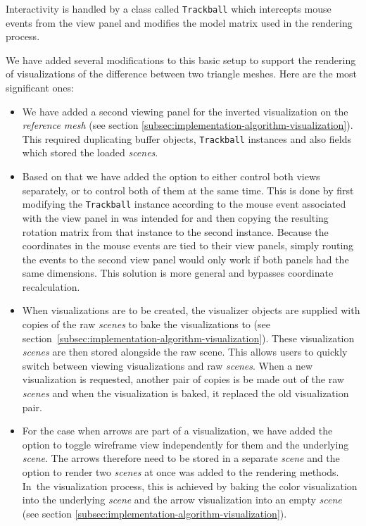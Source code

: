 Interactivity is handled by a class called \verb+Trackball+ which intercepts mouse events from the view panel and modifies the model matrix used in the rendering process.

We have added several modifications to this basic setup to support the rendering of visualizations of the difference between two triangle meshes. Here are the most significant ones:

\begin{itemize}
\item We have added a second viewing panel for the inverted visualization on the {\it reference mesh} (see section \ref{subsec:implementation-algorithm-visualization}). This required duplicating buffer objects, \verb+Trackball+ instances and also fields which stored the loaded {\it scenes}.
\item Based on that we have added the option to either control both views separately, or to control both of them at the same time. This is done by first modifying the \verb+Trackball+ instance according to the mouse event associated with the view panel in was intended for and then copying the resulting rotation matrix from that instance to the second instance. Because the coordinates in the mouse events are tied to their view panels, simply routing the events to the second view panel would only work if both panels had the same dimensions. This solution is more general and bypasses coordinate recalculation.
\item When visualizations are to be created, the visualizer objects are supplied with copies of the raw {\it scenes} to bake the visualizations to (see section~\ref{subsec:implementation-algorithm-visualization}). These visualization {\it scenes} are then stored alongside the raw scene. This allows users to quickly switch between viewing visualizations and raw {\it scenes}. When a new visualization is requested, another pair of copies is be made out of the raw {\it scenes} and when the visualization is baked, it replaced the old visualization pair.
\item For the case when arrows are part of a visualization, we have added the option to toggle wireframe view independently for them and the underlying {\it scene}. The arrows therefore need to be stored in a separate {\it scene} and the option to render two {\it scenes} at once was added to the rendering methods. In~the visualization process, this is achieved by baking the color visualization into the underlying {\it scene} and the arrow visualization into an empty {\it scene} (see section \ref{subsec:implementation-algorithm-visualization}).
\end{itemize}


